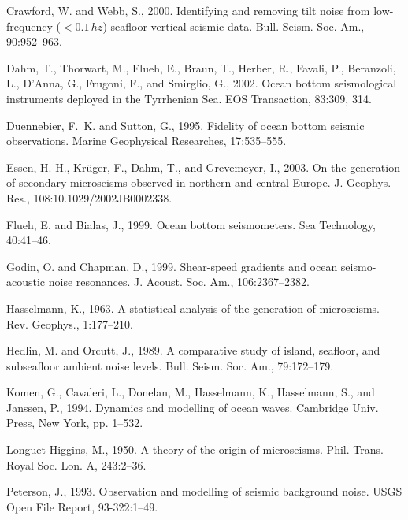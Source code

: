 \documentclass{article}
\begin{document}
{\begin{thebibliography}{}
Crawford, W. and Webb, S., 2000.
\newblock Identifying and removing tilt noise from low-frequency ($< 0.1\, hz$)
  seafloor vertical seismic data.
\newblock Bull. Seism. Soc. Am., 90:952--963.

Dahm, T., Thorwart, M., Flueh, E., Braun, T., Herber, R., Favali, P.,
  Beranzoli, L., D'Anna, G., Frugoni, F., and Smirglio, G., 2002.
\newblock Ocean bottom seismological instruments deployed in the {Tyrrhenian
  Sea}.
\newblock EOS Transaction, 83:309, 314.

Duennebier, F.~K. and Sutton, G., 1995.
\newblock Fidelity of ocean bottom seismic observations.
\newblock Marine Geophysical Researches, 17:535--555.

Essen, H.-H., Kr\"uger, F., Dahm, T., and Grevemeyer, I., 2003.
\newblock On the generation of secondary microseisms observed in northern and
  central {Europe}.
\newblock J. Geophys. Res., 108:10.1029/2002JB0002338.

Flueh, E. and Bialas, J., 1999.
\newblock Ocean bottom seismometers.
\newblock Sea Technology, 40:41--46.

Godin, O. and Chapman, D., 1999.
\newblock Shear-speed gradients and ocean seismo-acoustic noise resonances.
\newblock J. Acoust. Soc. Am., 106:2367--2382.

Hasselmann, K., 1963.
\newblock A statistical analysis of the generation of microseisms.
\newblock Rev. Geophys., 1:177--210.

Hedlin, M. and Orcutt, J., 1989.
\newblock A comparative study of island, seafloor, and subseafloor ambient
  noise levels.
\newblock Bull. Seism. Soc. Am., 79:172--179.

Komen, G., Cavaleri, L., Donelan, M., Hasselmann, K., Hasselmann, S., and
  Janssen, P., 1994.
\newblock Dynamics and modelling of ocean waves.
\newblock Cambridge Univ. Press, New York, pp. 1--532.

Longuet-Higgins, M., 1950.
\newblock A theory of the origin of microseisms.
\newblock Phil. Trans. Royal Soc. Lon. A, 243:2--36.

Peterson, J., 1993.
\newblock Observation and modelling of seismic background noise.
\newblock USGS Open File Report, 93-322:1--49.


\end{thebibliography}}
\end{document}
